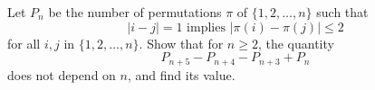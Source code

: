 Let $P_n$ be the number of permutations $\pi$ of $\{1,2,\dots,n\}$ such that
\[
|i-j| = 1 \mbox{ implies } |\pi(i) -\pi(j)| \leq 2
\]
for all $i,j$ in $\{1,2,\dots,n\}$. Show that for $n \geq 2$, the quantity
\[
P_{n+5} - P_{n+4} - P_{n+3} + P_n
\]
does not depend on $n$, and find its value.
